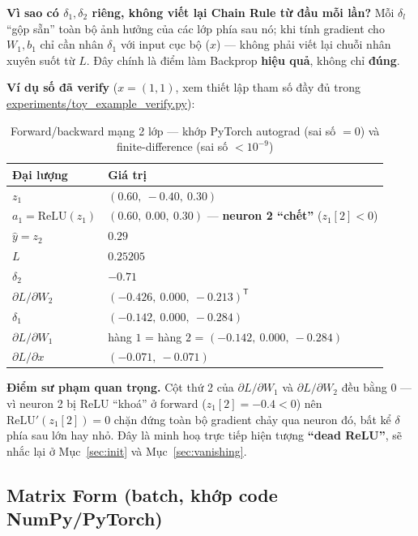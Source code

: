 \documentclass[12pt,a4paper]{article}
\newcommand{\T}{^{\mathsf{T}}}
\begin{document}
\textbf{Vì sao có $\delta_1,\delta_2$ riêng, không viết lại Chain Rule từ
đầu mỗi lần?} Mỗi $\delta_l$ ``gộp sẵn'' toàn bộ ảnh hưởng của các lớp phía
sau nó; khi tính gradient cho $W_1,b_1$ chỉ cần nhân $\delta_1$ với input
cục bộ ($x$) --- không phải viết lại chuỗi nhân xuyên suốt từ $L$. Đây
chính là điểm làm Backprop \textbf{hiệu quả}, không chỉ \textbf{đúng}.

\textbf{Ví dụ số đã verify} ($x=(1,1)$, xem thiết lập tham số đầy đủ trong
\url{experiments/toy_example_verify.py}):

\begin{table}[htbp]
\centering
\caption{Forward/backward mạng 2 lớp --- khớp PyTorch autograd (sai số $=0$)
và finite-difference (sai số $<10^{-9}$)}
\begin{tabular}{@{}ll@{}}
\toprule
\textbf{Đại lượng} & \textbf{Giá trị} \\
\midrule
$z_1$ & $(0.60,\ -0.40,\ 0.30)$ \\
$a_1=\mathrm{ReLU}(z_1)$ & $(0.60,\ 0.00,\ 0.30)$ --- \textbf{neuron 2 ``chết''} ($z_1[2]<0$) \\
$\hat y = z_2$ & $0.29$ \\
$L$ & $0.25205$ \\
$\delta_2$ & $-0.71$ \\
$\partial L/\partial W_2$ & $(-0.426,\ 0.000,\ -0.213)\T$ \\
$\delta_1$ & $(-0.142,\ 0.000,\ -0.284)$ \\
$\partial L/\partial W_1$ & hàng $1$ = hàng $2$ = $(-0.142,\ 0.000,\ -0.284)$ \\
$\partial L/\partial x$ & $(-0.071,\ -0.071)$ \\
\bottomrule
\end{tabular}
\label{tab:2layer_numeric}
\end{table}

\textbf{Điểm sư phạm quan trọng.} Cột thứ 2 của $\partial L/\partial W_1$
và $\partial L/\partial W_2$ đều bằng $0$ --- vì neuron 2 bị ReLU ``khoá'' ở
forward ($z_1[2]=-0.4<0$) nên $\mathrm{ReLU}'(z_1[2])=0$ chặn đứng toàn
bộ gradient chảy qua neuron đó, bất kể $\delta$ phía sau lớn hay nhỏ. Đây
là minh hoạ trực tiếp hiện tượng \textbf{``dead ReLU''}, sẽ nhắc lại ở
Mục~\ref{sec:init} và Mục~\ref{sec:vanishing}.

\subsection{Matrix Form (batch, khớp code NumPy/PyTorch)}
\label{sec:matrixform}
\end{document}
